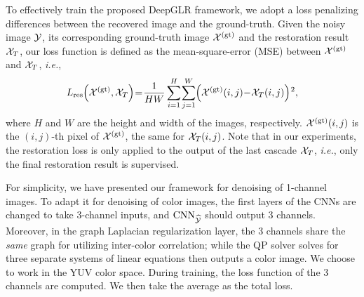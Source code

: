 \documentclass[10pt,twocolumn,letterpaper]{article}
\begin{document}
To effectively train the proposed DeepGLR framework, we adopt a loss penalizing differences between the recovered image and the ground-truth. 
Given the noisy image ${\cal Y}$, its corresponding ground-truth image ${\cal X}^{(\rm gt)}$ and the restoration result ${\cal X}_T$, our loss function is defined as the mean-square-error (MSE) between ${\cal X}^{(\rm gt)}$ and ${\cal X}_T$, {\it i.e.}, 
%
\begin{equation}\label{eq:loss_res}
L_{\rm res}\hspace{-2pt}\left({\cal X}^{(\rm gt)}, {\cal X}_T\right)\hspace{-2pt}=\hspace{-2pt}\frac{1}{HW}\sum_{i = 1}^H\hspace{-1pt}\sum_{j = 1}^W\hspace{-2pt}{\left ( {\cal X}^{\rm (gt)}(i,j)\hspace{-2pt}-\hspace{-2pt}{\cal X}_T(i,j) \right)\hspace{-1pt}^2},
\end{equation}
%
where $H$ and $W$ are the height and width of the images, respectively. ${\cal X}^{\rm (gt)}(i,j)$ is the $(i,j)$-th pixel of ${\cal X}^{\rm (gt)}$, the same for ${\cal X}_T(i,j)$. 
Note that in our experiments, the restoration loss is only applied to the output of the last cascade ${\cal X}_T$, {\it i.e.}, only the final restoration result is supervised.

For simplicity, we have presented our framework for denoising of 1-channel images. 
To adapt it for denoising of color images, the first layers of the CNNs are changed to take 3-channel inputs, and ${\rm CNN}_{\widehat{\cal Y}}$ should output 3 channels. 
Moreover, in the graph Laplacian regularization layer, the 3 channels share the \emph{same} graph for utilizing inter-color correlation; while the QP solver solves for three separate systems of linear equations then outputs a color image. 
We choose to work in the YUV color space.
During training, the loss function of the 3 channels are computed. 
We then take the average as the total loss.
\end{document}
